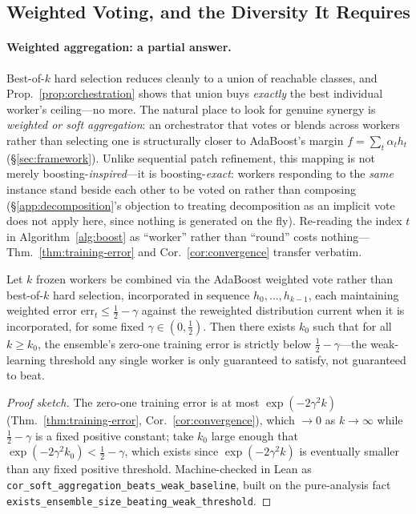 \subsection{Weighted Voting, and the Diversity It Requires}

\paragraph{Weighted aggregation: a partial answer.} Best-of-$k$ hard selection reduces cleanly to a union of reachable classes, and Prop.~\ref{prop:orchestration} shows that union buys \emph{exactly} the best individual worker's ceiling---no more. The natural place to look for genuine synergy is \emph{weighted or soft aggregation}: an orchestrator that votes or blends across workers rather than selecting one is structurally closer to AdaBoost's margin $f=\sum_t\alpha_t h_t$ (\S\ref{sec:framework}). Unlike sequential patch refinement, this mapping is not merely boosting-\emph{inspired}---it is boosting-\emph{exact}: workers responding to the \emph{same} instance stand beside each other to be voted on rather than composing (\S\ref{app:decomposition}'s objection to treating decomposition as an implicit vote does not apply here, since nothing is generated on the fly). Re-reading the index $t$ in Algorithm~\ref{alg:boost} as ``worker'' rather than ``round'' costs nothing---Thm.~\ref{thm:training-error} and Cor.~\ref{cor:convergence} transfer verbatim.

\begin{proposition}
\label{prop:soft-aggregation}
Let $k$ frozen workers be combined via the AdaBoost weighted vote rather than best-of-$k$ hard selection, incorporated in sequence $h_0,\dots,h_{k-1}$, each maintaining weighted error $\mathrm{err}_t \le \tfrac12-\gamma$ against the reweighted distribution current when it is incorporated, for some fixed $\gamma \in (0,\tfrac12)$. Then there exists $k_0$ such that for all $k \ge k_0$, the ensemble's zero-one training error is strictly below $\tfrac12-\gamma$---the weak-learning threshold any single worker is only guaranteed to satisfy, not guaranteed to beat.
\end{proposition}

\begin{proof}[Proof sketch]
The zero-one training error is at most $\exp(-2\gamma^2 k)$ (Thm.~\ref{thm:training-error}, Cor.~\ref{cor:convergence}), which $\to 0$ as $k\to\infty$ while $\tfrac12-\gamma$ is a fixed positive constant; take $k_0$ large enough that $\exp(-2\gamma^2 k_0) < \tfrac12-\gamma$, which exists since $\exp(-2\gamma^2 k)$ is eventually smaller than any fixed positive threshold. Machine-checked in Lean as \texttt{cor\_soft\_aggregation\_beats\_weak\_baseline}, built on the pure-analysis fact \texttt{exists\_ensemble\_size\_beating\_weak\_threshold}.
\end{proof}

